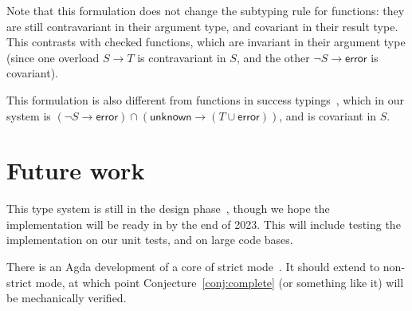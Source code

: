 \documentclass[sigplan]{acmart}
\newcommand{\ERROR}{\mathsf{error}}
\newcommand{\UNKNOWN}{\mathsf{unknown}}
\newcommand{\fun}{\mathbin{\rightarrow}}
\begin{document}
Note that this formulation does not change the subtyping rule for
functions: they are still contravariant in their argument type, and
covariant in their result type. This contrasts with checked functions,
which are invariant in their argument type (since one overload
$S \fun T$ is contravariant in $S$, and the other $\neg S \fun \ERROR$
is covariant).

This formulation is also different from functions in success
typings~\cite{SuccessTyping}, which in our system is $(\neg S \fun \ERROR) \cap
(\UNKNOWN \fun (T \cup \ERROR))$, and is covariant in $S$.

\section{Future work}

This type system is still in the design phase~\cite{NewNonStrictRFC}, though we hope
the implementation will be ready in by the end of 2023. This will include
testing the implementation on our unit tests, and on large code bases.

There is an Agda development of a core of strict mode~\cite{BJ23:agda-typeck}.  It
should extend to non-strict mode, at which point
Conjecture~\ref{conj:complete} (or something like it)
will be mechanically verified.
  
 
\end{document}
